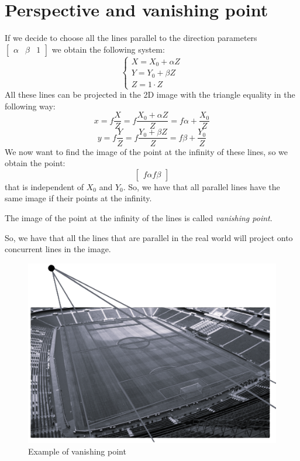 \documentclass[12pt, a4paper]{report}
\newtheorem[style=M,bodystyle=\normalfont]{theorem}{Theorem}
\newtheorem[style=M,bodystyle=\normalfont]{corollary}{Corollary}
\newtheorem[style=M,bodystyle=\normalfont]{lemma}{Lemma}
\newtheorem[style=M,bodystyle=\normalfont]{definition}{Definition}
\begin{document}
    \section{Perspective and vanishing point}
    If we decide to choose all the lines parallel to the direction parameters $\begin{bmatrix} \alpha & \beta & 1 \end{bmatrix}$ we obtain the following system: 
    \[
        \begin{cases}
            X = X_0 + \alpha Z  \\
            Y = Y_0 + \beta Z   \\
            Z = 1 \cdot Z
        \end{cases}
    \]
    All these lines can be projected in the 2D image with the triangle equality in the following way: 
    \[x=f \dfrac{X}{Z} = f \dfrac{X_0 + \alpha Z}{Z} = f\alpha + \dfrac{X_0}{Z}\]
    \[y=f \dfrac{Y}{Z} = f \dfrac{Y_0 + \beta Z}{Z}  = f\beta  + \dfrac{Y_0}{Z}\]
    We now want to find the image of the point at the infinity of these lines, so we obtain the point: 
    \[\begin{bmatrix} f\alpha f\beta \end{bmatrix}\]
    that is independent of $X_0$ and $Y_0$. So, we have that all parallel lines have the same image if their points at the infinity.
    \begin{definition}
        The image of the point at the infinity of the lines is called \emph{vanishing point}. 
    \end{definition}
    So, we have that all the lines that are parallel in the real world will project onto concurrent lines in the image. 
    \begin{figure}[H]
        \centering
        \includegraphics[width=0.6\linewidth]{images/vanishingpoint.png}
        \caption{Example of vanishing point}
    \end{figure}
\end{document}
